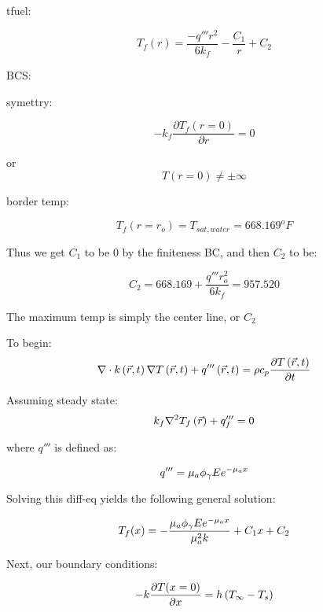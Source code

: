 \documentclass{article}
\begin{document}
tfuel:

\begin{equation}
    T_f(r) = \frac{-q'''r^2}{6k_f} - \frac{C_1}{r} + C_2
\end{equation}

BCS:

\quad symettry:

\begin{equation}
    -k_f \frac{\partial T_f(r = 0)}{\partial r} = 0
\end{equation}

or
\begin{equation}
    T(r = 0) \neq \pm \infty
\end{equation}

\quad border temp:

\begin{equation}
    T_f(r = r_o) = T_{sat,water} = 668.169 ^oF
\end{equation}

Thus we get $C_1$ to be 0 by the finiteness BC, and then $C_2$ to be:

\begin{equation}
    C_2 = 668.169 + \frac{q'''r_o^2}{6 k_f} = 957.520
\end{equation}

The maximum temp is simply the center line, or $C_2$

\newpage
{}
To begin:
\begin{equation}
    \nabla \cdot k\left(\Vec{r},t\right) \nabla T \left(\Vec{r},t\right) + q'''\left(\Vec{r},t\right) = \rho c_p \frac{\partial T \left(\Vec{r},t\right)}{\partial t}
\end{equation}

Assuming steady state:
\begin{equation}
    k_{f} \nabla^2 T_{f} \left(\Vec{r}\right) + q'''_{f} = 0
\end{equation}

where $q'''$ is defined as:

\begin{equation}
    q''' = \mu_a \phi_{\gamma} E e^{-\mu_a x}
\end{equation}

Solving this diff-eq yields the following general solution:

\begin{equation}
    T_f(x) = -\frac{\mu_a \phi_{\gamma} E e^{-\mu_a x}}{\mu_a^2 k } + C_1x + C_2
    \label{q2gensol}
\end{equation}

Next, our boundary conditions:

\begin{equation}
    -k \frac{\partial T(x = 0)}{\partial x} = h \left( T_{\infty} - T_s\right) 
\end{equation}
\end{document}
